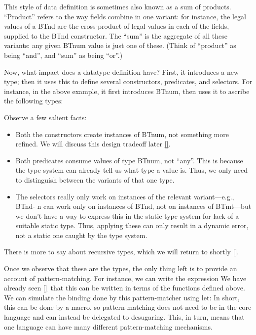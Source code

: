 This style of data definition is sometimes also known as a sum of products.
“Product” refers to the way fields combine in one variant: for instance, the
legal values of a BTnd are the cross-product of legal values in each of the
fields, supplied to the BTnd constructor. The “sum” is the aggregate of all
these variants: any given BTnum value is just one of these. (Think of “product”
as being “and”, and “sum” as being “or”.)


Now, what impact does a datatype definition have? First, it introduces a new
type; then it uses this to define several constructors, predicates, and
selectors. For instance, in the above example, it first introduces BTnum, then
uses it to ascribe the following types:

Observe a few salient facts:
\begin{itemize}
  \item 
Both the constructors create instances of BTnum, not something more refined.
We will discuss this design tradeoff later \ref{}.
  \item 
Both predicates consume values of type BTnum, not “any”. This is because the
type system can already tell us what type a value is. Thus, we only need to
distinguish between the variants of that one type.
  \item 
The selectors really only work on instances of the relevant variant—e.g., BTnd-
n can work only on instances of BTnd, not on instances of BTmt—but we don’t have
a way to express this in the static type system for lack of a suitable static
type. Thus, applying these can only result in a dynamic error, not a static one
caught by the type system.
\end{itemize}
There is more to say about recursive types, which we will return to shortly
\ref{}.


Once we observe that these are the types, the only thing left is to provide an
account of pattern-matching. For instance, we can write the expression
We have already seen \ref{}\ that this can be written in terms of the functions
defined above. We can simulate the binding done by this pattern-matcher using
let:
In short, this can be done by a macro, so pattern-matching does not need to be
in the core language and can instead be delegated to desugaring. This, in turn,
means that one language can have many different pattern-matching mechanisms.

